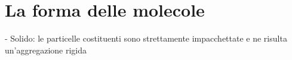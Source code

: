 \section{La forma delle molecole}
- Solido: le particelle costituenti sono strettamente impacchettate e ne risulta un'aggregazione rigida

